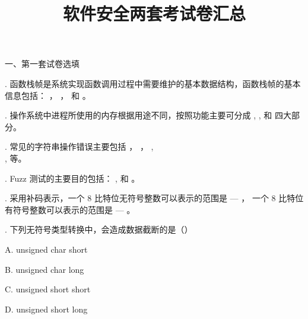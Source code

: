 \documentclass[UTF8]{ctexart}
\title{软件安全两套考试卷汇总}
\date{}
\begin{document}
\maketitle

\noindent
一、第一套试卷选填

. 函数栈帧是系统实现函数调用过程中需要维护的基本数据结构，函数栈帧的基本信息包括：
\underline{\hspace{3cm}}，
\underline{\hspace{3cm}}，
\underline{\hspace{3cm}}
和
\underline{\hspace{3cm}}。

. 操作系统中进程所使用的内存根据用途不同，按照功能主要可分成
\underline{\hspace{3cm}},
\underline{\hspace{3cm}},
\underline{\hspace{3cm}}
和
\underline{\hspace{3cm}}
四大部分。

. 常见的字符串操作错误主要包括
\underline{\hspace{3cm}}，
\underline{\hspace{3cm}}，
\underline{\hspace{3cm}},\\
\underline{\hspace{3cm}},
\underline{\hspace{3cm}}
等。

. Fuzz 测试的主要目的包括：
\underline{\hspace{3cm}},
\underline{\hspace{3cm}}
和
\underline{\hspace{3cm}}。

. 采用补码表示，一个 8 比特位无符号整数可以表示的范围是
\underline{\hspace{1cm}}
—
\underline{\hspace{1cm}}，
一个 8 比特位有符号整数可以表示的范围是
\underline{\hspace{1cm}}
—
\underline{\hspace{1cm}}。

. 下列无符号类型转换中，会造成数据截断的是（\quad）

\noindent
A. unsigned char \quad short

\noindent
B. unsigned char \quad long

\noindent
C. unsigned short \quad short

\noindent
D. unsigned short \quad long
\end{document}
